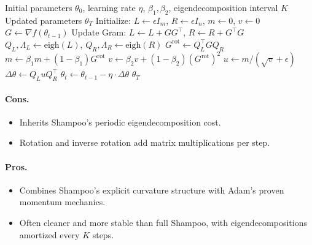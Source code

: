 \begin{algorithm}[H]
\caption{SOAP (Shampoo with Adam in Eigenbasis)}
\label{alg:soap}
\begin{algorithmic}[1]
\Require Initial parameters $\theta_0$, learning rate $\eta$, $\beta_1, \beta_2$, eigendecomposition interval $K$
\Ensure Updated parameters $\theta_T$
\State Initialize: $L \gets \epsilon I_m$, $R \gets \epsilon I_n$, $m \gets 0$, $v \gets 0$
    \State $G \gets \nabla f(\theta_{t-1})$ 
    \State Update Gram: $L \gets L + G G^\top$, $R \gets R + G^\top G$
        \State $Q_L, \Lambda_L \gets \text{eigh}(L)$, $Q_R, \Lambda_R \gets \text{eigh}(R)$
    \EndIf
    \State $G^{\text{rot}} \gets Q_L^\top G Q_R$ 
    \State $m \gets \beta_1 m + (1-\beta_1) G^{\text{rot}}$ 
    \State $v \gets \beta_2 v + (1-\beta_2) (G^{\text{rot}})^2$ 
    \State $u \gets m / (\sqrt{v} + \epsilon)$ 
    \State $\Delta \theta \gets Q_L u Q_R^\top$ 
    \State $\theta_t \gets \theta_{t-1} - \eta \cdot \Delta \theta$
\EndFor
\Return $\theta_T$
\end{algorithmic}
\end{algorithm}

\paragraph{Cons.}
\begin{itemize}[leftmargin=*]
\item Inherits Shampoo's periodic eigendecomposition cost.
\item Rotation and inverse rotation add matrix multiplications per step.
\end{itemize}

\paragraph{Pros.}
\begin{itemize}[leftmargin=*]
\item Combines Shampoo's explicit curvature structure with Adam's proven momentum mechanics.
\item Often cleaner and more stable than full Shampoo, with eigendecompositions amortized every $K$ steps.
\end{itemize}

